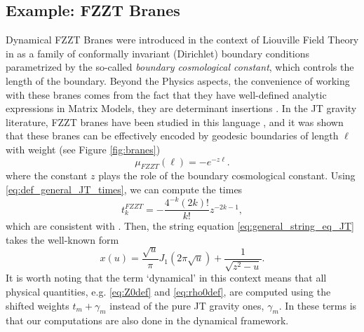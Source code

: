 \documentclass[a4paper,11pt]{article}
\begin{document}
\subsection{Example: FZZT Branes}
Dynamical FZZT Branes were introduced in the context of Liouville Field Theory in \cite{Fateev:2000ik} as a family of conformally invariant (Dirichlet) boundary conditions parametrized by the so-called \textit{boundary cosmological constant}, which controls the length of the boundary. Beyond the Physics aspects, the convenience of working with these branes comes from the fact that they have well-defined analytic expressions in Matrix Models, they are determinant insertions \cite{Aganagic:2003qj}. In the JT gravity literature, FZZT branes have been studied in this language \cite{Saad:2019lba,Blommaert:2019wfy}, and it was shown that these branes can be effectively encoded by geodesic boundaries of length $\ell$ with weight \cite{Okuyama:2021FZZT} (see Figure \ref{fig:branes})
\begin{equation}
    \mu_{FZZT}(\ell)=-e^{-z \ell}.
\end{equation}
where the constant $z$ plays the role of the boundary cosmological constant. Using \eqref{eq:def_general_JT_times}, we can compute the times 
\begin{equation}
    t_k^{FZZT}=-\frac{4^{-k}(2k)!}{k!}z^{-2 k-1}, 
\end{equation}
which are consistent with \cite{Okuyama:2021FZZT}. Then, the string equation \eqref{eq:general_string_eq_JT} takes the well-known form
\begin{equation}
     x(u)=\frac{\sqrt{u}}{\pi}J_1\left(2\pi\sqrt{u}\right)+\frac{1}{\sqrt{z^2-u}}.
\end{equation}
It is worth noting that the term `dynamical' in this context means that all physical quantities, e.g. \eqref{eq:Z0def} and \eqref{eq:rho0def}, are computed using the shifted weights $t_m+\gamma_m$ instead of the pure JT gravity ones, $\gamma_m$. In these terms is that our computations are also done in the dynamical framework.\\
\end{document}
